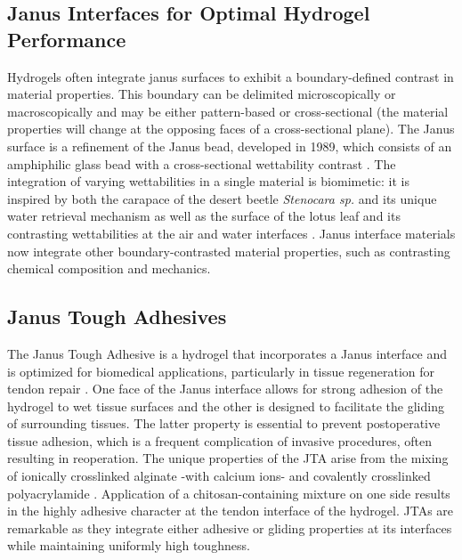 \subsection{Janus Interfaces for Optimal Hydrogel Performance}
Hydrogels often integrate janus surfaces to exhibit a boundary-defined contrast in material properties. This boundary can be delimited microscopically or macroscopically and may be either pattern-based or cross-sectional (the material properties will change at the opposing faces of a cross-sectional plane). The Janus surface is a refinement of the Janus bead, developed in 1989, which consists of an amphiphilic glass bead with a cross-sectional wettability contrast \autocite{janus_interface}. The integration of varying wettabilities in a single material is biomimetic: it is inspired by both the carapace of the desert beetle \textit{Stenocara sp.} and its unique water retrieval mechanism as well as the surface of the lotus leaf and its contrasting wettabilities at the air and water interfaces \autocite{janus_interface}. Janus interface materials now integrate other boundary-contrasted material properties, such as contrasting chemical composition and mechanics. 

\subsection{Janus Tough Adhesives}
The Janus Tough Adhesive is a hydrogel that incorporates a Janus interface and is optimized for biomedical applications, particularly in tissue regeneration for tendon repair \autocite{freedmanEnhancedTendonHealing2022}. One face of the Janus interface allows for strong adhesion of the hydrogel to wet tissue surfaces and the other is designed to facilitate the gliding of surrounding tissues. The latter property is essential to prevent postoperative tissue adhesion, which is a frequent complication of invasive procedures, often resulting in reoperation. The unique properties of the JTA arise from the mixing of ionically crosslinked alginate -with calcium ions- and covalently crosslinked polyacrylamide \autocite{freedmanEnhancedTendonHealing2022}. Application of a chitosan-containing mixture on one side results in the highly adhesive character at the tendon interface of the hydrogel. JTAs are remarkable as they integrate either adhesive or gliding properties at its interfaces while maintaining uniformly high toughness. 

